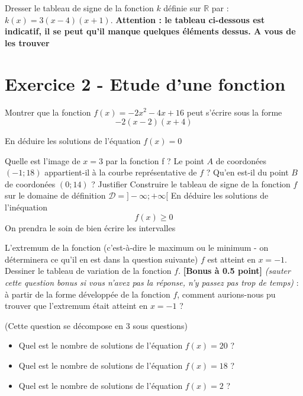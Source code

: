 \documentclass{exam}
\begin{document}
\begin{questions}
 \question[1] Dresser le tableau de signe de la fonction $k$ définie sur $\mathbb{R}$ par : $k(x) = 3(x-4)(x+1)$. \textbf{Attention : le tableau ci-dessous est indicatif, il se peut qu'il manque quelques éléments dessus. A vous de les trouver} \par
\vspace{1em}

\end{questions}

\section{Exercice 2 - Etude d'une fonction}

\begin{questions}

\question[2] Montrer que la fonction $f(x) = -2x^2 - 4x + 16$ peut s'écrire sous la forme 
\[
-2(x-2)(x+4)
\]

\question[1] En déduire les solutions de l'équation $f(x)=0$

\question[1] Quelle est l'image de $x=3$ par la fonction f ?
\question[1] Le point $A$ de coordonées $(-1 ; 18)$ appartient-il à la courbe représentative de $f$ ? Qu'en est-il du point $B$ de coordonées $(0 ; 14)$ ? Justifier
\question[2] Construire le tableau de signe de la fonction $f$ sur le domaine de définition $\mathcal{D} = ] - \infty ; + \infty [$
\question[1] En déduire les solutions de l'inéquation 
\[
f(x) \geq 0
\]
On prendra le soin de bien écrire les intervalles

\question[1] L'extremum de la fonction (c'est-à-dire le maximum ou le minimum - on déterminera ce qu'il en est dans la question suivante) $f$ est atteint en $x = -1$. Dessiner le tableau de variation de la fonction $f$. \textbf{[Bonus à 0.5 point]} \textit{(sauter cette question bonus si vous n'avez pas la réponse, n'y passez pas trop de temps)} : à partir de la forme développée de la fonction $f$, comment aurions-nous pu trouver que l'extremum était atteint en $x=-1$ ?

\question[1] (Cette question se décompose en 3 sous questions) 
  \begin{itemize}
    \item Quel est le nombre de solutions de l'équation $f(x) = 20$ ?
    \item Quel est le nombre de solutions de l'équation $f(x) = 18$ ?
    \item Quel est le nombre de solutions de l'équation $f(x) = 2$ ?
  \end{itemize}


\end{questions}
\end{document}
